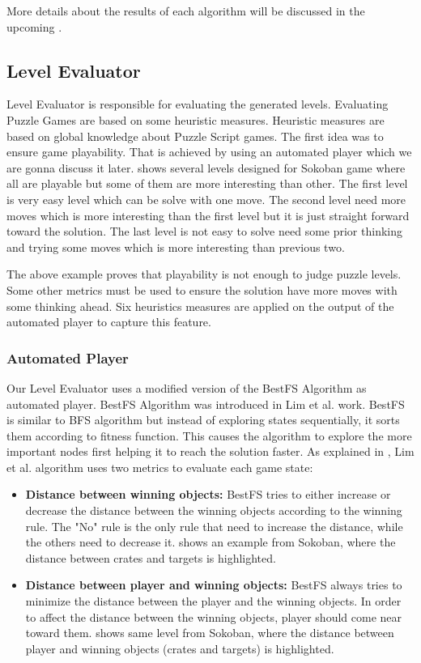 More details about the results of each algorithm will be discussed in the upcoming .
\subsection{Level Evaluator}
Level Evaluator is responsible for evaluating the generated levels. Evaluating Puzzle Games are based on some heuristic measures. Heuristic measures are based on global knowledge about Puzzle Script games. The first idea was to ensure game playability. That is achieved by using an automated player which we are gonna discuss it later.  shows several levels designed for Sokoban game where all are playable but some of them are more interesting than other. The first level is very easy level which can be solve with one move. The second level need more moves which is more interesting than the first level but it is just straight forward toward the solution. The last level is not easy to solve need some prior thinking and trying some moves which is more interesting than previous two.


The above example proves that playability is not enough to judge puzzle levels. Some other metrics must be used to ensure the solution have more moves with some thinking ahead. Six heuristics measures are applied on the output of the automated player to capture this feature.

\subsubsection{Automated Player}
Our Level Evaluator uses a modified version of the BestFS Algorithm as automated player. BestFS Algorithm was introduced in Lim et al.\cite{puzzleScriptGeneration} work. BestFS is similar to BFS algorithm but instead of exploring states sequentially, it sorts them according to fitness function. This causes the algorithm to explore the more important nodes first helping it to reach the solution faster. As explained in , Lim et al. algorithm uses two metrics to evaluate each game state:
\begin{itemize} \itemsep0pt \parskip0pt 
	\item \textbf{Distance between winning objects:} BestFS tries to either increase or decrease the distance between the winning objects according to the winning rule. The "No" rule is the only rule that need to increase the distance, while the others need to decrease it.  shows an example from Sokoban, where the distance between crates and targets is highlighted.
	\item \textbf{Distance between player and winning objects:} BestFS always tries to minimize the distance between the player and the winning objects. In order to affect the distance between the winning objects, player should come near toward them.  shows same level from Sokoban, where the distance between player and winning objects (crates and targets) is highlighted.
\end{itemize}

